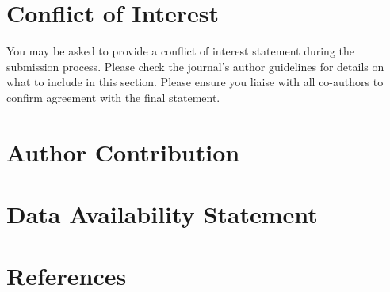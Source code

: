 \documentclass[alpha-refs]{wiley-article}
\begin{document}
\section*{Conflict of Interest}
You may be asked to provide a conflict of interest statement during the submission process. Please check the journal's author guidelines for details on what to include in this section. Please ensure you liaise with all co-authors to confirm agreement with the final statement.

\section*{Author Contribution}

\section*{Data Availability Statement}



\section{References}




\end{document}
